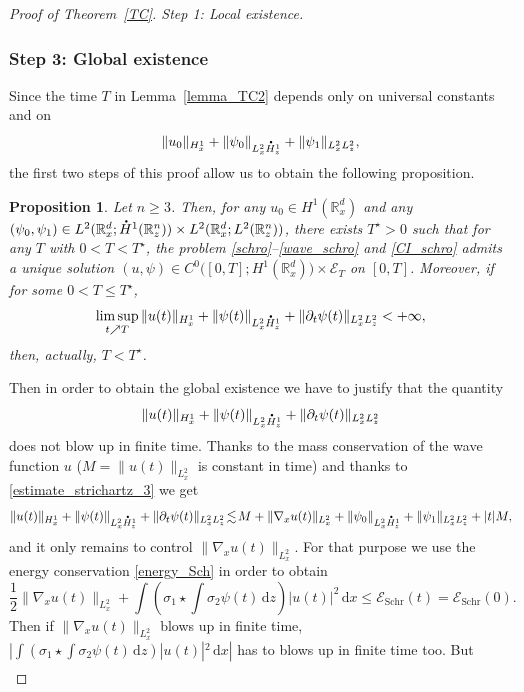 \documentclass[JEP,XML,SOM,NoEqCountersInSection,NoFloatCountersInSection,Unicode,published]{cedram}
\newtheorem{proposition}[lemma]{Proposition}
\theoremstyle{definition}
\newcommand*{\overbigdot}[1]{%
\accentset{\mbox{\large\bfseries .}}{#1}}
\newenvironment{ProofOf}[1]{\begin{proof}[Proof of #1]}{\end{proof}}
\newcommand{\R}{\mathbb{R}}
\newcommand{\ud}{\, {\mathrm{d}}}
\begin{document}
\begin{ProofOf}{Theorem~\ref{TC}. Step 1: Local existence}
\subsubsection*{Step 3: Global existence} Since the time $T$ in Lemma~\ref{lemma_TC2} depends only on universal constants and on\vspace*{-3pt}
\[
\|u_{0}\|_{H_{x}^{1}}+\|\psi_{0}\|_{L_{x}^{2}\overbigdot{H}_{z}^{1}}+\|\psi_{1}\|_{L_{x}^{2}L_{z}^{2}},
\]
the first two steps of this proof allow us to obtain the following proposition.
\begin{proposition}
Let $n\geq 3$. Then, for any $u_{0}\in H^{1}(\R_{x}^{d})$ and any $(\psi_{0},\psi_{1})\in L^{2}(\R_{x}^{d};\overbigdot{H}^{1}(\R_{z}^{n}))\times L^{2}(\R_{x}^{d};L^{2}(\R_{z}^{n}))$, there exists $T^{\star}>0$ such that for any $T$ with $0<T<T^{\star}$, the problem \eqref{schro}--\eqref{wave_schro} and \eqref{CI_schro} admits a unique solution \hbox{$(u,\psi)\in C^{0}\bigl([0,T];H^{1}(\R_{x}^{d})\bigr)\times\mathcal{E}_{T}$} on $[0,T]$. Moreover, if for some $0<T\leq T^{\star}$,
\[
\underset{t\nearrow T}{\limsup}\,\|u(t)\|_{H_{x}^{1}}+\|\psi(t)\|_{L_{x}^{2}\overbigdot{H}_{z}^{1}}+\|\partial_{t}\psi(t)\|_{L_{x}^{2}L_{z}^{2}}<+\infty,
\]
then, actually, $T<T^{\star}$.
\end{proposition}
Then in order to obtain the global existence we have to justify that the quantity
\[
\|u(t)\|_{H_{x}^{1}}+\|\psi(t)\|_{L_{x}^{2}\overbigdot{H}_{z}^{1}}+\|\partial_{t}\psi(t)\|_{L_{x}^{2}L_{z}^{2}}
\]
does not blow up in finite time. Thanks to the mass conservation of the wave function $u$ ($M=\|u(t)\|_{L_{x}^{2}}$ is constant in time) and thanks to \eqref{estimate_strichartz_3} we get
\[
\|u(t)\|_{H_{x}^{1}}+\|\psi(t)\|_{L_{x}^{2}\overbigdot{H}_{z}^{1}}+\|\partial_{t}\psi(t)\|_{L_{x}^{2}L_{z}^{2}}\!\lesssim\! M+\|\nabla_{x}u(t)\|_{L_{x}^{2}}+\|\psi_{0}\|_{L_{x}^{2}\overbigdot{H}_{z}^{1}}+\|\psi_{1}\|_{L_{x}^{2}L_{z}^{2}}+|t|M,
\]
and it only remains to control $\|\nabla_{x}u(t)\|_{L_{x}^{2}}$. For that purpose we use the energy conservation
\eqref{energy_Sch}
in order to obtain
\[
\frac{1}{2}\|\nabla_{x}u(t)\|_{L_{x}^{2}}+\int\left(\sigma_{1}\star\int\sigma_{2}\psi(t)\ud z\right)|u(t)|^{2}\ud x\leq \mathcal E_{\mathrm {Schr}}(t)= \mathcal E_{\mathrm {Schr}}(0).
\]
Then if $\|\nabla_{x}u(t)\|_{L_{x}^{2}}$ blows up in finite time, $|\int(\sigma_{1}\star\int\sigma_{2}\psi(t)\ud z)|u(t)|^{2}\ud x|$ has to blows up in finite time too. But
\begin{equation}\label{estimate_utile}
\begin{split}

\end{split}
\end{equation}
\end{ProofOf}
\end{document}
